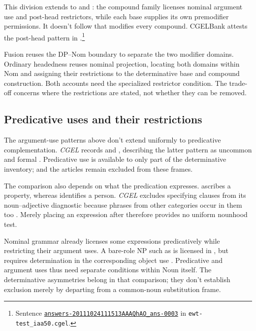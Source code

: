 \documentclass[12pt]{article}
\begin{document}
This division extends to  and : the compound family licenses nominal argument use and post-head restrictors, while each base supplies its own premodifier permissions. It doesn't follow that  modifies every compound. CGELBank attests the post-head pattern in .\footnote{Sentence \href{https://github.com/nert-nlp/cgel/blob/d0a2c2d8c522b23d5aa879fc9cb94948f4285b2c/datasets/ewt-test_iaa50.cgel\#L179-L181}{\nolinkurl{answers-20111024111513AAAQhAO_ans-0003}} in \nolinkurl{ewt-test_iaa50.cgel}.}

Fusion reuses the DP--Nom boundary to separate the two modifier domains. Ordinary headedness reuses nominal projection, locating both domains within Nom and assigning their restrictions to the determinative base and compound construction. Both accounts need the specialized restrictor condition. The trade-off concerns where the restrictions are stated, not whether they can be removed.

\subsection{Predicative uses and their restrictions}\label{sec:predication}

The argument-use patterns above don't extend uniformly to predicative complementation. \textit{CGEL} records  and , describing the latter pattern as uncommon and formal \citep[392, 395--396]{huddleston2002}. Predicative use is available to only part of the determinative inventory;  and the articles remain excluded from these frames.

The comparison also depends on what the predication expresses.  ascribes a property, whereas  identifies a person. \textit{CGEL} excludes specifying  clauses from its noun--adjective diagnostic because phrases from other categories occur in them too \citep[536]{huddleston2002}. Merely placing an expression after  therefore provides no uniform nounhood test.

Nominal grammar already licenses some expressions predicatively while restricting their argument uses. A bare-role NP such as  is licensed in , but requires determination in the corresponding object use  \citep[328]{huddleston2002}. Predicative and argument uses thus need separate conditions within Noun itself. The determinative asymmetries belong in that comparison; they don't establish exclusion merely by departing from a common-noun substitution frame.
\end{document}
